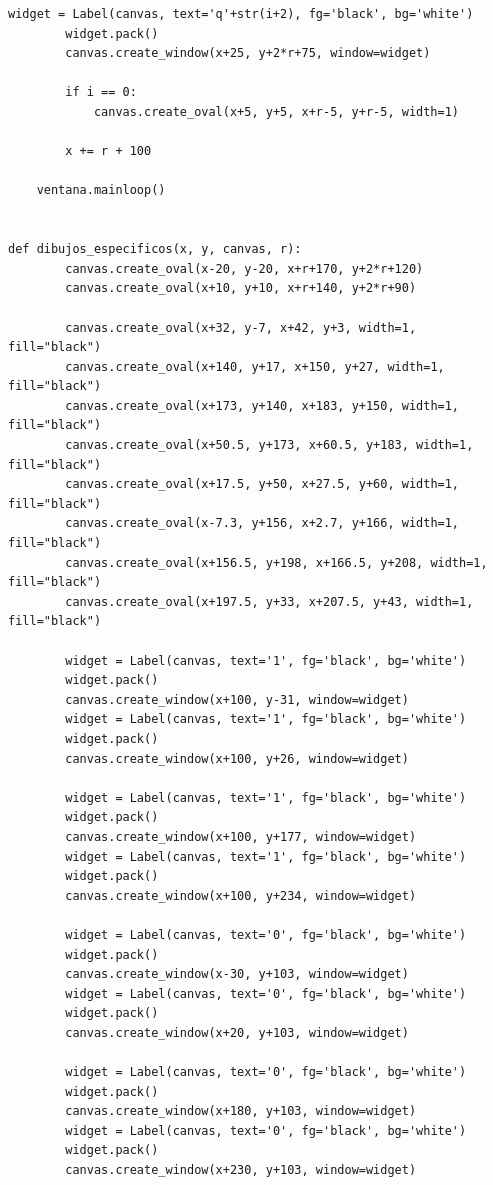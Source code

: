 \documentclass[12pt]{article}
\begin{document}
\begin{lstlisting}[frame=single]
        widget = Label(canvas, text='q'+str(i+2), fg='black', bg='white')
        widget.pack()
        canvas.create_window(x+25, y+2*r+75, window=widget)

        if i == 0:
            canvas.create_oval(x+5, y+5, x+r-5, y+r-5, width=1)

        x += r + 100

    ventana.mainloop()


def dibujos_especificos(x, y, canvas, r):
        canvas.create_oval(x-20, y-20, x+r+170, y+2*r+120)
        canvas.create_oval(x+10, y+10, x+r+140, y+2*r+90)

        canvas.create_oval(x+32, y-7, x+42, y+3, width=1, fill="black")
        canvas.create_oval(x+140, y+17, x+150, y+27, width=1, fill="black")
        canvas.create_oval(x+173, y+140, x+183, y+150, width=1, fill="black")
        canvas.create_oval(x+50.5, y+173, x+60.5, y+183, width=1, fill="black")
        canvas.create_oval(x+17.5, y+50, x+27.5, y+60, width=1, fill="black")
        canvas.create_oval(x-7.3, y+156, x+2.7, y+166, width=1, fill="black")
        canvas.create_oval(x+156.5, y+198, x+166.5, y+208, width=1, fill="black")
        canvas.create_oval(x+197.5, y+33, x+207.5, y+43, width=1, fill="black")

        widget = Label(canvas, text='1', fg='black', bg='white')
        widget.pack()
        canvas.create_window(x+100, y-31, window=widget)
        widget = Label(canvas, text='1', fg='black', bg='white')
        widget.pack()
        canvas.create_window(x+100, y+26, window=widget)

        widget = Label(canvas, text='1', fg='black', bg='white')
        widget.pack()
        canvas.create_window(x+100, y+177, window=widget)
        widget = Label(canvas, text='1', fg='black', bg='white')
        widget.pack()
        canvas.create_window(x+100, y+234, window=widget)

        widget = Label(canvas, text='0', fg='black', bg='white')
        widget.pack()
        canvas.create_window(x-30, y+103, window=widget)
        widget = Label(canvas, text='0', fg='black', bg='white')
        widget.pack()
        canvas.create_window(x+20, y+103, window=widget)

        widget = Label(canvas, text='0', fg='black', bg='white')
        widget.pack()
        canvas.create_window(x+180, y+103, window=widget)
        widget = Label(canvas, text='0', fg='black', bg='white')
        widget.pack()
        canvas.create_window(x+230, y+103, window=widget)

\end{lstlisting}
\end{document}
